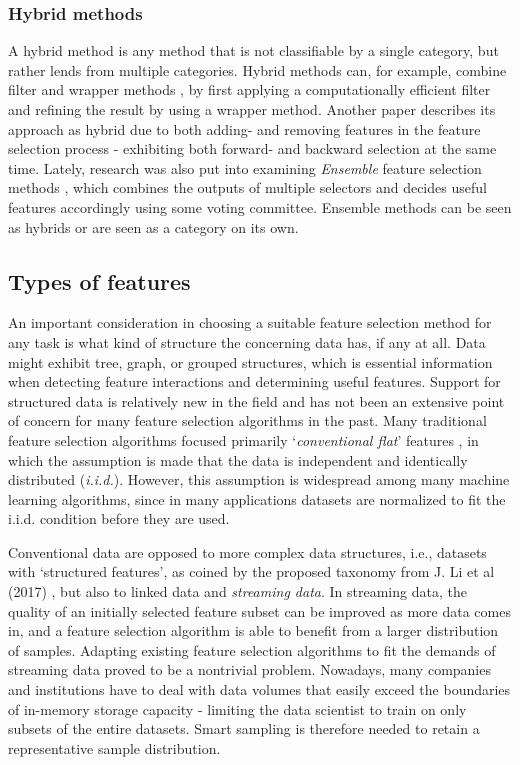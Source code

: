 \documentclass[../main.tex]{subfiles}
\begin{document}
\subsubsection{Hybrid methods}
A hybrid method is any method that is not classifiable by a single category, but rather lends from multiple categories. Hybrid methods can, for example, combine filter and wrapper methods \citep{hsu_hybrid_2011}, by first applying a computationally efficient filter and refining the result by using a wrapper method. Another paper \citep{das_filters_2001} describes its approach as hybrid due to both adding- and removing features in the feature selection process - exhibiting both forward- and backward selection at the same time. Lately, research was also put into examining \textit{Ensemble} feature selection methods \citep{bolon-canedo_ensembles_2019}, which combines the outputs of multiple selectors and decides useful features accordingly using some voting committee. Ensemble methods can be seen as hybrids or are seen as a category on its own.



\subsection{Types of features}
An important consideration in choosing a suitable feature selection method for any task is what kind of structure the concerning data has, if any at all. Data might exhibit tree, graph, or grouped structures, which is essential information when detecting feature interactions and determining useful features. Support for structured data is relatively new in the field and has not been an extensive point of concern for many feature selection algorithms in the past. Many traditional feature selection algorithms focused primarily `\textit{conventional flat}' features \citep{li_feature_2017}, in which the assumption is made that the data is independent and identically distributed (\textit{i.i.d.}). However, this assumption is widespread among many machine learning algorithms, since in many applications datasets are normalized to fit the i.i.d. condition before they are used.

Conventional data are opposed to more complex data structures, i.e., datasets with `structured features', as coined by the proposed taxonomy from J. Li et al (2017) \cite{li_feature_2017}, but also to linked data and \textit{streaming data}. In streaming data, the quality of an initially selected feature subset can be improved as more data comes in, and a feature selection algorithm is able to benefit from a larger distribution of samples. Adapting existing feature selection algorithms to fit the demands of streaming data proved to be a nontrivial problem. Nowadays, many companies and institutions have to deal with data volumes that easily exceed the boundaries of in-memory storage capacity - limiting the data scientist to train on only subsets of the entire datasets. Smart sampling is therefore needed to retain a representative sample distribution.
\end{document}
